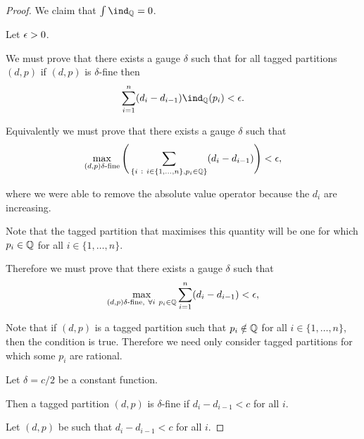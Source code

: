 \begin{proof}
  We claim that $\int \ind_\Q = 0$.

  Let $\epsilon > 0$.

  We must prove that there exists a gauge $\delta$ such that for all tagged partitions $(d, p)$ if $(d, p)$
  is $\delta$-fine then
  \begin{align*}
    \sum_{i=1}^n (d_i - d_{i-1})\ind_\Q(p_i) < \eps.
  \end{align*}



  Equivalently we must prove that there exists a gauge $\delta$ such that
  \begin{align*}
    \max_{(d, p) \delta\text{-fine}} \Bigg( \sum_{\{i ~:~ i \in \{1, \ldots, n\}, p_i \in \mathbb{Q}\}} (d_i - d_{i-1}) \Bigg) < \epsilon,
  \end{align*}

  where we were able to remove the absolute value operator because the $d_i$ are increasing.

  Note that the tagged partition that maximises this quantity will be one for which $p_i \in \mathbb{Q}$ for
  all $i \in \{1, \ldots, n\}$.

  Therefore we must prove that there exists a gauge $\delta$ such that
  \begin{align*}
    \max_{(d, p) \delta\text{-fine}, ~\forall i ~ p_i \in \mathbb{Q}} \sum_{i=1}^n (d_i - d_{i-1}) < \epsilon,
  \end{align*}



  Note that if $(d, p)$ is a tagged partition such that $p_i \notin \mathbb{Q}$ for all $i \in \{1, \ldots, n\}$, then
  the condition is true. Therefore we need only consider tagged partitions for which some $p_i$ are rational.

  Let $\delta = c/2$ be a constant function.

  Then a tagged partition $(d, p)$ is $\delta$-fine if $d_{i} - d_{i-1} < c$ for all $i$.

  Let   $(d, p)$ be such that $d_{i} - d_{i-1} < c$ for all $i$.

\end{proof}










